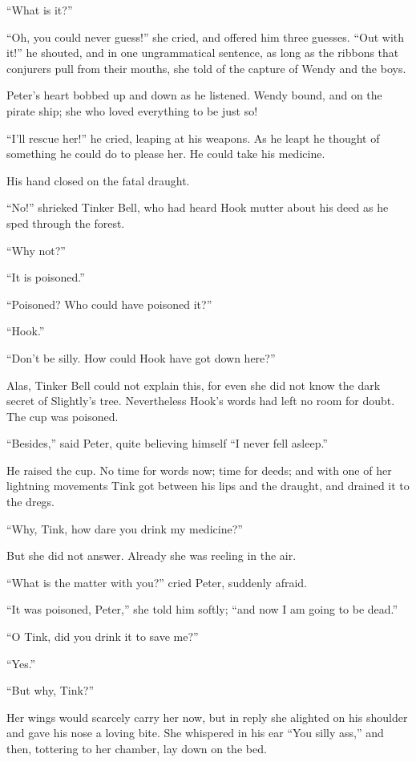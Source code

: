 “What is it?”

“Oh, you could never guess!\@” she cried, and offered him three guesses.
“Out with it!\@” he shouted,
and in one ungrammatical sentence, as long as the ribbons that conjurers pull from their mouths,
she told of the capture of Wendy and the boys.

Peter’s heart bobbed up and down as he listened.
Wendy bound, and on the pirate ship;
she who loved everything to be just so!

“I’ll rescue her!\@” he cried, leaping at his weapons.
As he leapt he thought of something he could do to please her.
He could take his medicine.

His hand closed on the fatal draught.

“No!\@” shrieked Tinker Bell,
who had heard Hook mutter about his deed as he sped through the forest.

“Why not?”

“It is poisoned.”

“Poisoned?
Who could have poisoned it?”

“Hook.”

“Don’t be silly.
How could Hook have got down here?”

Alas, Tinker Bell could not explain this,
for even she did not know the dark secret of Slightly’s tree.
Nevertheless Hook’s words had left no room for doubt.
The cup was poisoned.

“Besides,” said Peter, quite believing himself “I never fell asleep.”

He raised the cup.
No time for words now;
time for deeds;
and with one of her lightning movements Tink got between his lips and the draught,
and drained it to the dregs.

“Why, Tink, how dare you drink my medicine?”

But she did not answer.
Already she was reeling in the air.

“What is the matter with you?\@” cried Peter, suddenly afraid.

“It was poisoned, Peter,” she told him softly;
“and now I am going to be dead.”

“O Tink, did you drink it to save me?”

“Yes.”

“But why, Tink?”

Her wings would scarcely carry her now,
but in reply she alighted on his shoulder and gave his nose a loving bite.
She whispered in his ear “You silly ass,”
and then, tottering to her chamber, lay down on the bed.

